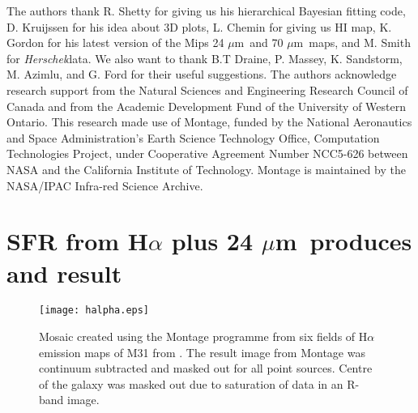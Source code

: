 \documentclass[useAMS,usenatbib]{mn2e}
\newcommand \um    {$\mu$m\ }
\newcommand \Herschel {{\it Herschel}}
\begin{document}
The authors thank R. Shetty for giving us his hierarchical Bayesian fitting code, D. Kruijssen for his idea about 3D plots, L. Chemin for giving us HI map, K. Gordon for his latest version of the Mips 24 \um and 70 \um maps, and M. Smith for \Herschel data. We also want to thank B.T Draine, P. Massey, K. Sandstorm, M. Azimlu, and G. Ford for their useful suggestions.
The authors acknowledge research support from the Natural Sciences and Engineering Research Council of Canada and from the Academic Development Fund of the University of Western Ontario. 
This research made use of Montage, funded by the National Aeronautics and Space Administration's Earth Science Technology Office, Computation Technologies Project, under Cooperative Agreement Number NCC5-626 between NASA and the California Institute of Technology. Montage is maintained by the NASA/IPAC Infra-red Science Archive.




\appendix
\section{SFR from H$\alpha$ plus 24 \um produces and result}
\label{app:halpha}


\begin{figure*}
\centering
\texttt{[image: halpha.eps]}
\caption{Mosaic created using the Montage programme from six fields of H$\alpha$ emission maps of M31 from \cite{Massey07}. The result image from Montage was continuum subtracted and masked out for all point sources. Centre of the galaxy was masked out due to saturation of data in an R-band image.}
\label{fig:halpha}
\end{figure*}
\end{document}
